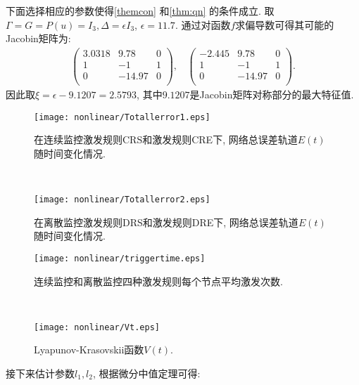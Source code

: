         下面选择相应的参数使得\autoref{themcon} 和\autoref{thm:qn} 的条件成立.
        取$\Gamma=G=P(u)=I_3, \Delta=\epsilon I_3$, $\epsilon=11.7$. 通过对函数$f$求偏导数可得其可能的Jacobin矩阵为:
        \begin{align*}
        \left(
              \begin{array}{ccc}
                3.0318 & 9.78 & 0 \\
                1 & -1 & 1 \\
                0 & -14.97 & 0 \\
              \end{array}
            \right),~~~~
        \left(
              \begin{array}{ccc}
                -2.445 & 9.78 & 0 \\
                1 & -1 & 1 \\
                0 & -14.97 & 0 \\
              \end{array}
            \right).
        \end{align*}
        因此取$\xi=\epsilon-9.1207=2.5793$, 其中$9.1207$是Jacobin矩阵对称部分的最大特征值.
\begin{figure}[!htb]
\begin{minipage}[t]{0.48\linewidth}
\centering
\texttt{[image: nonlinear/Totallerror1.eps]}
\caption{在连续监控激发规则CRS和激发规则CRE下, 网络总误差轨道$E(t)$随时间变化情况.}\label{Totallerror1}
\end{minipage}~~
\begin{minipage}[t]{0.48\linewidth}
\centering
\texttt{[image: nonlinear/Totallerror2.eps]}
\caption{在离散监控激发规则DRS和激发规则DRE下, 网络总误差轨道$E(t)$随时间变化情况.}\label{Totallerror2}
\end{minipage}
\end{figure}
\begin{figure}[!htb]
\begin{minipage}[t]{0.48\linewidth}
\centering
\texttt{[image: nonlinear/triggertime.eps]}
\caption{连续监控和离散监控四种激发规则每个节点平均激发次数.}\label{tritime}
\end{minipage}~~
\begin{minipage}[t]{0.48\linewidth}
\centering
\texttt{[image: nonlinear/Vt.eps]}
\caption{Lyapunov-Krasovskii函数$V(t)$.}\label{Vt}
\end{minipage}
\end{figure}
        接下来估计参数$l_1,l_2$, 根据微分中值定理可得:
